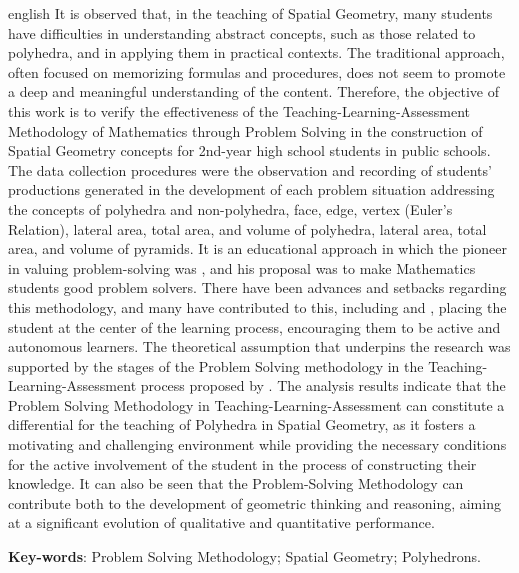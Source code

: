
\begin{resumo}[Abstract]
	\begin{otherlanguage*}{english}
		It is observed that, in the teaching of Spatial Geometry, many students have difficulties in understanding abstract concepts, such as those related to polyhedra, and in applying them in practical contexts. The traditional approach, often focused on memorizing formulas and procedures, does not seem to promote a deep and meaningful understanding of the content. Therefore, the objective of this work is to verify the effectiveness of the Teaching-Learning-Assessment Methodology of Mathematics through Problem Solving in the construction of Spatial Geometry concepts for 2nd-year high school students in public schools. The data collection procedures were the observation and recording of students' productions generated in the development of each problem situation addressing the concepts of polyhedra and non-polyhedra, face, edge, vertex (Euler's Relation), lateral area, total area, and volume of polyhedra, lateral area, total area, and volume of pyramids. It is an educational approach in which the pioneer in valuing problem-solving was , and his proposal was to make Mathematics students good problem solvers. There have been advances and setbacks regarding this methodology, and many have contributed to this, including  and , placing the student at the center of the learning process, encouraging them to be active and autonomous learners. The theoretical assumption that underpins the research was supported by the stages of the Problem Solving methodology in the Teaching-Learning-Assessment process proposed by . The analysis results indicate that the Problem Solving Methodology in Teaching-Learning-Assessment can constitute a differential for the teaching of Polyhedra in Spatial Geometry, as it fosters a motivating and challenging environment while providing the necessary conditions for the active involvement of the student in the process of constructing their knowledge. It can also be seen that the Problem-Solving Methodology can contribute both to the development of geometric thinking and reasoning, aiming at a significant evolution of qualitative and quantitative performance.

		\vspace{\onelineskip}

		\noindent
		\textbf{Key-words}: Problem Solving Methodology; Spatial Geometry; Polyhedrons.
	\end{otherlanguage*}
\end{resumo}
